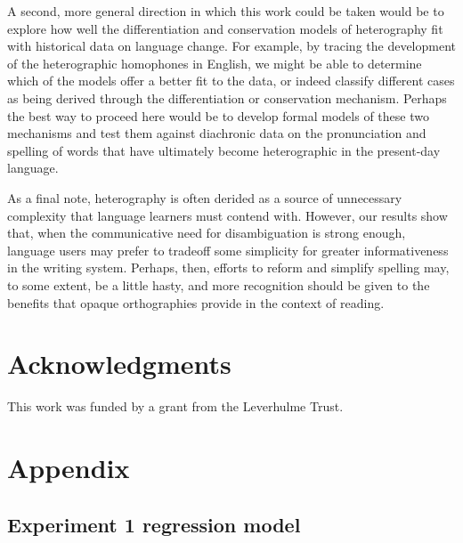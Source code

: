 \documentclass[doc,biblatex]{apa7}
\begin{document}
A second, more general direction in which this work could be taken would be to explore how well the differentiation and conservation models of heterography fit with historical data on language change. For example, by tracing the development of the heterographic homophones in English, we might be able to determine which of the models offer a better fit to the data, or indeed classify different cases as being derived through the differentiation or conservation mechanism. Perhaps the best way to proceed here would be to develop formal models of these two mechanisms and test them against diachronic data on the pronunciation and spelling of words that have ultimately become heterographic in the present-day language.

As a final note, heterography is often derided as a source of unnecessary complexity that language learners must contend with. However, our results show that, when the communicative need for disambiguation is strong enough, language users may prefer to tradeoff some simplicity for greater informativeness in the writing system. Perhaps, then, efforts to reform and simplify spelling may, to some extent, be a little hasty, and more recognition should be given to the benefits that opaque orthographies provide in the context of reading.


\section{Acknowledgments}

\noindent This work was funded by a grant from the Leverhulme Trust.

\printbibliography


\clearpage

\section{Appendix}

\subsection{Experiment 1 regression model}
\end{document}
